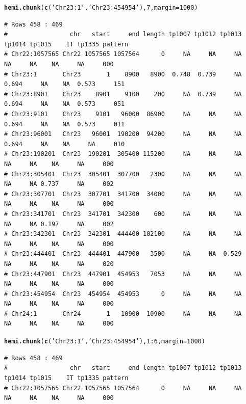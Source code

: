 \documentclass{article}\usepackage[]{graphicx}\usepackage[]{color}
\makeatletter
\newcommand{\hlnum}[1]{\textcolor[rgb]{0.686,0.059,0.569}{#1}}%
\newcommand{\hlstr}[1]{\textcolor[rgb]{0.192,0.494,0.8}{#1}}%
\newcommand{\hlopt}[1]{\textcolor[rgb]{0,0,0}{#1}}%
\newcommand{\hlstd}[1]{\textcolor[rgb]{0.345,0.345,0.345}{#1}}%
\newcommand{\hlkwc}[1]{\textcolor[rgb]{0.333,0.667,0.333}{#1}}%
\newcommand{\hlkwd}[1]{\textcolor[rgb]{0.737,0.353,0.396}{\textbf{#1}}}%
\newenvironment{kframe}{%
 \def\at@end@of@kframe{}%
 \ifinner\ifhmode%
  \def\at@end@of@kframe{\end{minipage}}%
  \begin{minipage}{\columnwidth}%
 \fi\fi%
 \def\FrameCommand##1{\hskip\@totalleftmargin \hskip-\fboxsep
 \colorbox{shadecolor}{##1}\hskip-\fboxsep
     \hskip-\linewidth \hskip-\@totalleftmargin \hskip\columnwidth}%
 \MakeFramed {\advance\hsize-\width
   \@totalleftmargin\z@ \linewidth\hsize
   \@setminipage}}%
 {\par\unskip\endMakeFramed%
 \at@end@of@kframe}
\newenvironment{knitrout}{}{} %
\makeatother
\begin{document}
\begin{knitrout}\footnotesize
{}\color{fgcolor}\begin{kframe}
\begin{alltt}
\hlkwd{hemi.chunk}\hlstd{(}\hlkwd{c}\hlstd{(}\hlstr{'Chr23:1'}\hlstd{,}\hlstr{'Chr23:454954'}\hlstd{),}\hlnum{7}\hlstd{,}\hlkwc{margin}\hlstd{=}\hlnum{1000}\hlstd{)}
\end{alltt}
\begin{verbatim}
# Rows 458 : 469 
#                 chr   start     end length tp1007 tp1012 tp1013 tp1014 tp1015    IT tp1335 pattern
# Chr22:1057565 Chr22 1057565 1057564      0     NA     NA     NA     NA     NA    NA     NA     000
# Chr23:1       Chr23       1    8900   8900  0.748  0.739     NA  0.694     NA    NA  0.573     151
# Chr23:8901    Chr23    8901    9100    200     NA  0.739     NA  0.694     NA    NA  0.573     051
# Chr23:9101    Chr23    9101   96000  86900     NA     NA     NA  0.694     NA    NA  0.573     011
# Chr23:96001   Chr23   96001  190200  94200     NA     NA     NA  0.694     NA    NA     NA     010
# Chr23:190201  Chr23  190201  305400 115200     NA     NA     NA     NA     NA    NA     NA     000
# Chr23:305401  Chr23  305401  307700   2300     NA     NA     NA     NA     NA 0.737     NA     002
# Chr23:307701  Chr23  307701  341700  34000     NA     NA     NA     NA     NA    NA     NA     000
# Chr23:341701  Chr23  341701  342300    600     NA     NA     NA     NA     NA 0.197     NA     002
# Chr23:342301  Chr23  342301  444400 102100     NA     NA     NA     NA     NA    NA     NA     000
# Chr23:444401  Chr23  444401  447900   3500     NA     NA  0.529     NA     NA    NA     NA     020
# Chr23:447901  Chr23  447901  454953   7053     NA     NA     NA     NA     NA    NA     NA     000
# Chr23:454954  Chr23  454954  454953      0     NA     NA     NA     NA     NA    NA     NA     000
# Chr24:1       Chr24       1   10900  10900     NA     NA     NA     NA     NA    NA     NA     000
\end{verbatim}
\begin{alltt}
\hlkwd{hemi.chunk}\hlstd{(}\hlkwd{c}\hlstd{(}\hlstr{'Chr23:1'}\hlstd{,}\hlstr{'Chr23:454954'}\hlstd{),}\hlnum{1}\hlopt{:}\hlnum{6}\hlstd{,}\hlkwc{margin}\hlstd{=}\hlnum{1000}\hlstd{)}
\end{alltt}
\begin{verbatim}
# Rows 458 : 469 
#                 chr   start     end length tp1007 tp1012 tp1013 tp1014 tp1015    IT tp1335 pattern
# Chr22:1057565 Chr22 1057565 1057564      0     NA     NA     NA     NA     NA    NA     NA     000

\end{verbatim}
\end{kframe}
\end{knitrout}
\end{document}
